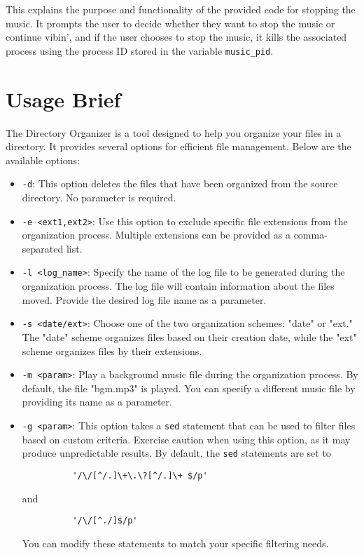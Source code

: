 \documentclass[12pt]{article}
\begin{document}
    This explains the purpose and functionality of the provided code for stopping the music. It prompts the user to decide whether they want to stop the music or continue vibin', and if the user chooses to stop the music, it kills the associated process using the process ID stored in the variable \texttt{music\_pid}.
    
    \section{Usage Brief}
    The Directory Organizer is a tool designed to help you organize your files in a directory. It provides several options for efficient file management. Below are the available options:
    
    \begin{itemize}
      \item \texttt{-d}: This option deletes the files that have been organized from the source directory. No parameter is required.
      \item \texttt{-e <ext1,ext2>}: Use this option to exclude specific file extensions from the organization process. Multiple extensions can be provided as a comma-separated list.
      \item \texttt{-l <log\_name>}: Specify the name of the log file to be generated during the organization process. The log file will contain information about the files moved. Provide the desired log file name as a parameter.
      \item \texttt{-s <date/ext>}: Choose one of the two organization schemes: "date" or "ext." The "date" scheme organizes files based on their creation date, while the "ext" scheme organizes files by their extensions.
      \item \texttt{-m <param>}: Play a background music file during the organization process. By default, the file "bgm.mp3" is played. You can specify a different music file by providing its name as a parameter.
      \item \texttt{-g <param>}: This option takes a \texttt{sed} statement that can be used to filter files based on custom criteria. Exercise caution when using this option, as it may produce unpredictable results. By default, the \texttt{sed} statements are set to 
      \begin{verbatim}
          '/\/[^/.]\+\.\?[^/.]\+ $/p'
      \end{verbatim} and 
      \begin{verbatim}
          '/\/[^./]$/p'
      \end{verbatim}
      You can modify these statements to match your specific filtering needs.
    \end{itemize}
    
\end{document}
